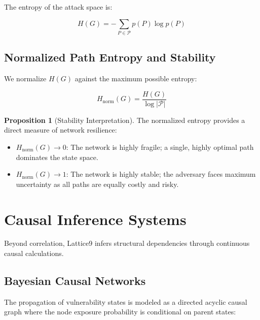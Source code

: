 \documentclass[11pt,a4paper]{article}
\theoremstyle{definition}
\newtheorem{proposition}[theorem]{Proposition}
\numberwithin{equation}{section}
\newcommand{\set}[1]{\mathcal{#1}}
\begin{document}
The entropy of the attack space is:

\begin{equation}\label{eq:entropy}
H(G) = -\sum_{P \in \set{P}} p(P) \log p(P)
\end{equation}

\subsection{Normalized Path Entropy and Stability}\label{subsec:norm-entropy}

We normalize $H(G)$ against the maximum possible entropy:

\begin{equation}\label{eq:norm-entropy}
H_{\text{norm}}(G) = \frac{H(G)}{\log |\set{P}|}
\end{equation}

\begin{proposition}[Stability Interpretation]
\label{prop:stability}
The normalized entropy provides a direct measure of network resilience:
\begin{itemize}[leftmargin=2em]
    \item $H_{\text{norm}}(G) \to 0$: The network is highly fragile; a single, highly optimal path dominates the state space.
    \item $H_{\text{norm}}(G) \to 1$: The network is highly stable; the adversary faces maximum uncertainty as all paths are equally costly and risky.
\end{itemize}
\end{proposition}

\section{Causal Inference Systems}\label{sec:causal-inference}

Beyond correlation, Lattice9 infers structural dependencies through continuous causal calculations.

\subsection{Bayesian Causal Networks}\label{subsec:causal-net}

The propagation of vulnerability states is modeled as a directed acyclic causal graph where the node exposure probability is conditional on parent states:
\end{document}
